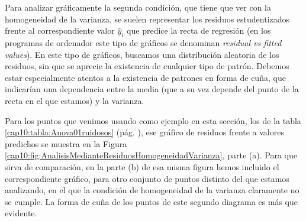 Para analizar gráficamente la segunda condición, que tiene que ver con la homogeneidad de la varianza, se suelen representar los residuos estudentizados frente al correspondiente valor $\hat y_i$ que predice la recta de regresión (en los programas de ordenador este tipo de gráficos se denominan {\em residual vs fitted values}). En este tipo de gráficos, buscamos una distribución aleatoria de los residuos, sin que se aprecie la existencia de cualquier tipo de patrón. Debemos estar especialmente atentos a la existencia de patrones en forma de cuña, que indicarían una dependencia entre la media (que a su vez depende del punto de la recta en el que estamos) y la varianza.

\begin{ejemplo}\label{cap10:ejem:AnalisisGraficoResiduos02}
Para los puntos que venimos usando como ejemplo en esta sección, los de la tabla \ref{cap10:tabla:Anova01ruidosos} (pág. \pageref{cap10:tabla:Anova01ruidosos}), ese gráfico de residuos frente a valores predichos se muestra en la Figura  \ref{cap10:fig:AnalisisMedianteResiduosHomogeneidadVarianza}, parte (a). Para que sirva de comparación, en la parte (b) de esa misma figura hemos incluido el correspondiente gráfico, para otro conjunto de puntos distinto del que estamos analizando, en el que la condición de homogeneidad de la varianza claramente no se cumple. La forma de cuña de los puntos de este segundo diagrama es más que evidente.


\end{ejemplo}
